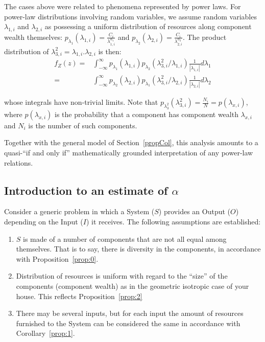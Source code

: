 \documentclass[a4paper, 11pt]{article} %
\begin{document}
The cases above were related to phenomena represented by power laws.
For power-law distributions involving random variables, we assume
random variables
$\lambda_{1,i}$ and $\lambda_{2,i}$ as possessing a uniform distribution of resources along component wealth
themselves:
$p_{\lambda_{1}}(\lambda_{1,i})=\frac{C_i}{\lambda_{1,i}^{\alpha_1}}$
and
$p_{\lambda_{2}}(\lambda_{2,i})=\frac{C_i}{\lambda_{2,i}^{\alpha_2}}$.
The product distribution of
$\lambda_{3,i}^2=\lambda_{1,i}.\lambda_{2,i}$
is then:
\begin{align}
	f_Z(z) = & \int_{-\infty}^{\infty} p_{\lambda_1}(\lambda_{1,i}) p_{\lambda_2}(\lambda_{3,i}^2/\lambda_{1,i})\frac{1}{|\lambda_{1,i}|}d\lambda_1 \\
	= & \int_{-\infty}^{\infty} p_{\lambda_2}(\lambda_{2,i}) p_{\lambda_1}(\lambda_{3,i}^2/\lambda_{2,i})\frac{1}{|\lambda_{2,i}|}d\lambda_2
\end{align}

\noindent whose integrals have non-trivial limits.
Note that $p_{\lambda_3^2}(\lambda_{3,i}^2)=\frac{N_i}{N}=p(\lambda_{x,i})$,
where $p(\lambda_{x,i})$ is the probability that a component has component wealth $\lambda_{x,i}$ and $N_i$ is the number of such components. 


Together with the general model of Section~\ref{propCol}, this analysis amounts to a quasi-``if and only if'' mathematically grounded interpretation of any power-law relations.

\subsection{Introduction to an estimate of $\alpha$}
Consider a generic problem in which a System ($S$) provides an Output ($O$) depending on the Input ($I$) it receives.
The following assumptions are established:
\begin{enumerate}
	\item $S$ is made of a number of components that are not all equal among themselves.
That is to say, there is diversity in the components, in accordance with Proposition~\ref{prop:0}. 
\item Distribution of resources is uniform with regard to the ``size'' of the components (component wealth) as in the geometric isotropic case of your house.
This reflects Proposition~\ref{prop:2}
\item There may be several inputs, but for each input the amount of resources furnished to the System can be considered the same 
	in accordance with Corollary~\ref{prop:1}.
\end{enumerate}
\end{document}
